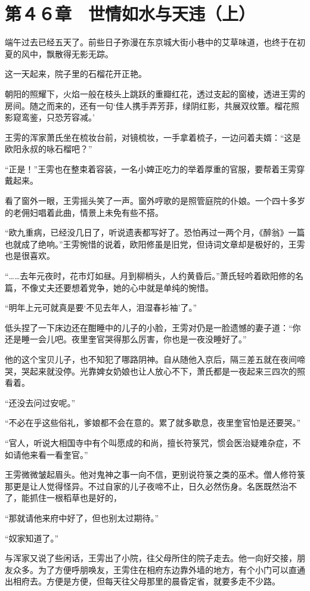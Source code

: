 \section{第４６章　世情如水与天违（上）}

端午过去已经五天了。前些日子弥漫在东京城大街小巷中的艾草味道，也终于在初夏的风中，飘散得无影无踪。

这一天起来，院子里的石榴花开正艳。

朝阳的照耀下，火焰一般在枝头上跳跃的重瓣红花，透过支起的窗棱，透进王雱的房间。随之而来的，还有一句‘佳人携手弄芳菲，绿阴红影，共展双纹簟。榴花照影窥鸾鉴，只恐芳容减。’

王雱的浑家萧氏坐在梳妆台前，对镜梳妆，一手拿着梳子，一边问着夫婿：“这是欧阳永叔的咏石榴吧？”

“正是！”王雱也在整束着容装，一名小婢正吃力的举着厚重的官服，要帮着王雱穿戴起来。

看了窗外一眼，王雱摇头笑了一声。窗外哼歌的是照管庭院的仆娘。一个四十多岁的老佣妇唱着此曲，情景上未免有些不搭。

“欧九重病，已经没几日了，听说遗表都写好了。恐怕再过一两个月，《醉翁》一篇也就成了绝响。”王雱惋惜的说着，欧阳修虽是旧党，但诗词文章却是极好的，王雱也是很喜欢。

“……去年元夜时，花市灯如昼。月到柳梢头，人约黄昏后。”萧氏轻吟着欧阳修的名篇，不像丈夫还要想着党争，她的心中就是单纯的惋惜。

“明年上元可就真是要‘不见去年人，泪湿春衫袖’了。”

低头捏了一下床边还在酣睡中的儿子的小脸，王雱对仍是一脸遗憾的妻子道：“你还是睡一会儿吧。夜里奎官哭得那么厉害，你也是一夜没睡好了。”

他的这个宝贝儿子，也不知犯了哪路阴神。自从随他入京后，隔三差五就在夜间啼哭，哭起来就没停。光靠婢女奶娘也让人放心不下，萧氏都是一夜起来三四次的照看着。

“还没去问过安呢。”

“不必在乎这些俗礼，爹娘都不会在意的。累了就多歇息，夜里奎官怕是还要哭。”

“官人，听说大相国寺中有个叫愿成的和尚，擅长符箓咒，惯会医治疑难杂症，不如请他来看一看奎官。”

王雱微微皱起眉头。他对鬼神之事一向不信，更别说符箓之类的巫术。僧人修符箓那更是让人觉得怪异。不过自家的儿子夜啼不止，日久必然伤身。名医既然治不了，能抓住一根稻草也是好的，

“那就请他来府中好了，但也别太过期待。”

“奴家知道了。”

与浑家又说了些闲话，王雱出了小院，往父母所住的院子走去。他一向好交接，朋友众多。为了方便呼朋唤友，王雱住在相府东边靠外墙的地方，有个小门可以直通出相府去。方便是方便，但每天往父母那里的晨昏定省，就要多走不少路。

